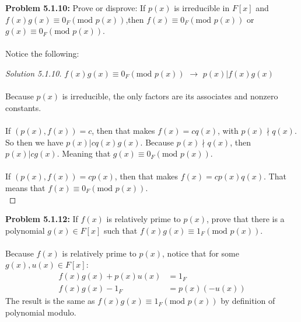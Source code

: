 \documentclass[12pt]{article}
\begin{document}
\noindent \textbf{Problem 5.1.10: }Prove or disprove: If $p(x)$ is irreducible in $F[x]$ and $f(x)g(x) \equiv 0_F(\text{mod } p(x))$,then $f(x) \equiv 0_F(\text{mod } p(x))$ or $g(x) \equiv 0_F(\text{mod } p(x))$.
\\ \\ 
Notice the following:
	\begin{proof}[Solution 5.1.10]
		$f(x)g(x) \equiv 0_F(\text{mod } p(x))$ $\rightarrow$ $p(x) | f(x)g(x)$
		\\ \\
		Because $p(x)$ is irreducible, the only factors are its associates and nonzero constants.
		\\ \\
		If $(p(x),f(x)) = c$, then that makes $f(x) = cq(x)$, with $p(x) \nmid q(x)$. So then we have $p(x) | cq(x)g(x)$.  Because $p(x) \nmid q(x)$, then $p(x) | cg(x)$.  Meaning that $g(x) \equiv 0_F(\text{mod } p(x))$.
		\\ \\
		If $(p(x),f(x)) = cp(x)$, then that makes $f(x) = cp(x)q(x)$. That means that $f(x) \equiv 0_F(\text{mod } p(x))$.
		\\
	\end{proof}

\newpage 

\noindent \textbf{Problem 5.1.12: }If $f(x)$ is relatively prime to $p(x)$, prove that there is a polynomial $g(x) \in F[x]$ such that $f(x)g(x) \equiv 1_F (\text{mod } p(x))$. 
\\ \\
Because $f(x)$ is relatively prime to $p(x)$, notice that for some $g(x),u(x) \in F[x]$:
	\begin{align*}
		f(x)g(x) + p(x)u(x) &= 1_F \\
		f(x)g(x) - 1_F &= p(x)(-u(x))
	\end{align*}
The result is the same as $f(x)g(x) \equiv 1_F (\text{mod } p(x))$ by definition of polynomial modulo.

\newpage 
\end{document}
